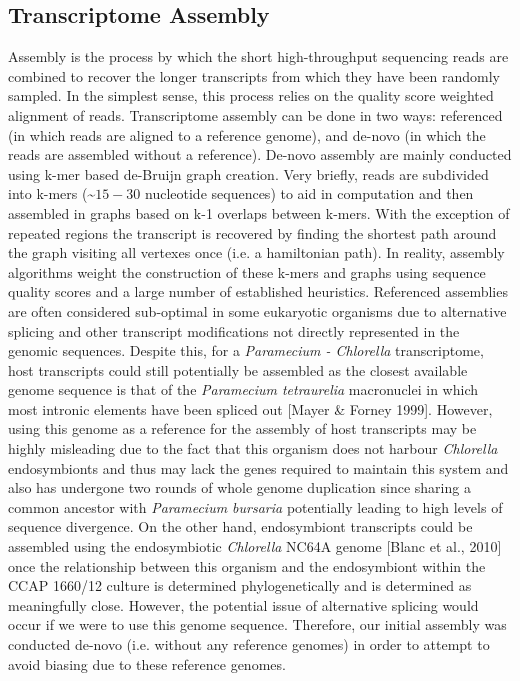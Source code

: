 \subsection{Transcriptome Assembly}
Assembly is the process by which the short high-throughput sequencing reads are combined to recover the longer transcripts from which they have been randomly sampled.  
In the simplest sense, this process relies on the quality score weighted alignment of reads.  
Transcriptome assembly can be done in two ways: referenced (in which reads are aligned to a reference genome), and de-novo (in which the reads are assembled without a reference).  
De-novo assembly are mainly conducted using k-mer based de-Bruijn graph creation.  
Very briefly, reads are subdivided into k-mers (\textasciitilde $15-30$ nucleotide sequences) to aid in computation and then assembled in graphs based on k-1 overlaps between k-mers.
With the exception of repeated regions the transcript is recovered by finding the shortest path around the graph visiting all vertexes once (i.e. a hamiltonian path). 
In reality, assembly algorithms weight the construction of these k-mers and graphs using sequence quality scores and a large number of established heuristics.
Referenced assemblies are often considered sub-optimal in some eukaryotic organisms due to alternative splicing and other transcript modifications not directly represented in the genomic sequences.  
Despite this, for a \textit{Paramecium - Chlorella} transcriptome, host transcripts could still potentially be assembled as the closest available genome sequence is that of the \textit{Paramecium tetraurelia} macronuclei in which most intronic elements have been spliced out [Mayer \& Forney 1999].  
However, using this genome as a reference for the assembly of host transcripts may be highly misleading due to the fact that this organism does not harbour \textit{Chlorella} endosymbionts and thus may lack the genes required to maintain this system and also has undergone two rounds of whole genome duplication since sharing a common ancestor with \textit{Paramecium bursaria} potentially leading to high levels of sequence divergence.  
On the other hand, endosymbiont transcripts could be assembled using the endosymbiotic \textit{Chlorella} NC64A genome [Blanc et al., 2010] once the relationship between this organism and the endosymbiont within the CCAP 1660/12 culture is determined phylogenetically and is determined as meaningfully close.  However, the potential issue of alternative splicing would occur if we were to use this genome sequence.  
Therefore, our initial assembly was conducted de-novo (i.e. without any reference genomes) in order to attempt to avoid biasing due to these reference genomes.   


